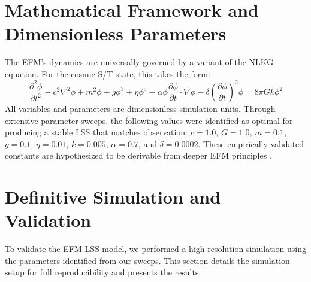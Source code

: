 \documentclass[11pt]{article}
\begin{document}
\section{Mathematical Framework and Dimensionless Parameters}
The EFM’s dynamics are universally governed by a variant of the NLKG equation. For the cosmic S/T state, this takes the form:
\begin{equation}
\frac{\partial^2\phi}{\partial t^2} - c^2\nabla^2\phi + m^2\phi + g\phi^3 + \eta\phi^5 - \alpha\phi\frac{\partial\phi}{\partial t}\cdot\nabla\phi - \delta\left(\frac{\partial\phi}{\partial t}\right)^2\phi = 8\pi Gk\phi^2
\label{eq:nlkg_full}
\end{equation}
All variables and parameters are dimensionless simulation units. Through extensive parameter sweeps, the following values were identified as optimal for producing a stable LSS that matches observation: \(c=1.0\), \(G=1.0\), \(m=0.1\), \(g=0.1\), \(\eta=0.01\), \(k=0.005\), \(\alpha=0.7\), and \(\delta=0.0002\). These empirically-validated constants are hypothesized to be derivable from deeper EFM principles \citep{EFMDimensionlessPaper}.

\section{Definitive Simulation and Validation}
To validate the EFM LSS model, we performed a high-resolution simulation using the parameters identified from our sweeps. This section details the simulation setup for full reproducibility and presents the results.
\end{document}
